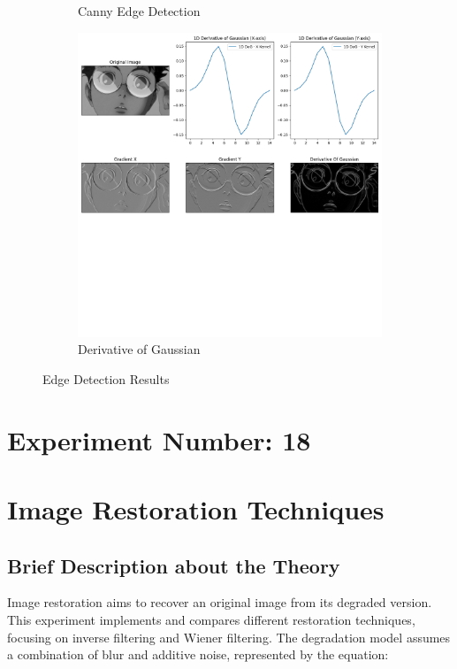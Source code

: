 \documentclass[12pt,a4paper]{article}
\begin{document}
\begin{figure}[H]
\begin{subfigure}[b]{0.45\textwidth}
    \caption{Canny Edge Detection}
  \end{subfigure}
  \vspace{1em}
  \begin{subfigure}[b]{0.45\textwidth}
    \includegraphics[width=\textwidth]{edge_detection/derivative_of_gaussian.png}
    \caption{Derivative of Gaussian}
  \end{subfigure}
  \caption{Edge Detection Results}
  \label{fig:edge_detection}
\end{figure}

\newpage
\section*{Experiment Number: 18}
\section{Image Restoration Techniques}

\subsection{Brief Description about the Theory}
Image restoration aims to recover an original image from its degraded version. This experiment implements and compares different restoration techniques, focusing on inverse filtering and Wiener filtering. The degradation model assumes a combination of blur and additive noise, represented by the equation:
\end{document}
